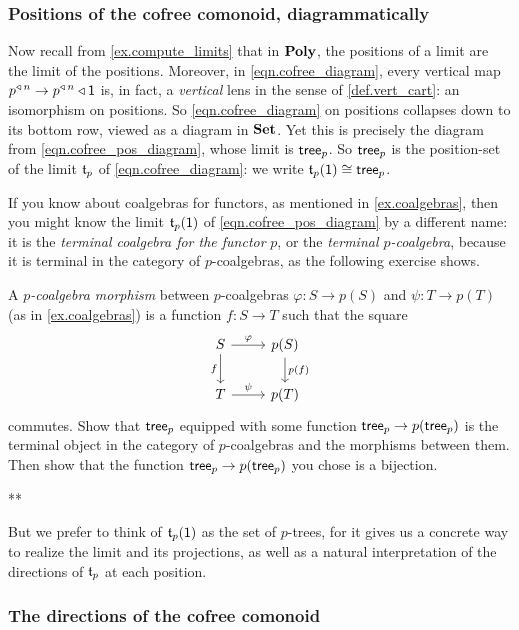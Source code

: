 \documentclass[Book-Poly]{subfiles}
\begin{document}
\subsubsection{Positions of the cofree comonoid, diagrammatically}

Now recall from \cref{ex.compute_limits} that in $\mathbf{Poly}$, the positions of a limit are the limit of the positions.
Moreover, in \eqref{eqn.cofree_diagram}, every vertical map $p^{\mathbin{\triangleleft}\,n}\to p^{\mathbin{\triangleleft}\,n}\mathbin{\triangleleft}\textsf{1}$ is, in fact, a \emph{vertical} lens in the sense of \cref{def.vert_cart}: an isomorphism on positions.
So \eqref{eqn.cofree_diagram} on positions collapses down to its bottom row, viewed as a diagram in $\mathbf{Set}$.
Yet this is precisely the diagram from \eqref{eqn.cofree_pos_diagram}, whose limit is $\mathsf{tree}_p$.
So $\mathsf{tree}_p$ is the position-set of the limit $\mathfrak{t}_p$ of \eqref{eqn.cofree_diagram}: we write $\mathfrak{t}_p(\textsf{1})\cong\mathsf{tree}_p$.

If you know about coalgebras for functors, as mentioned in \cref{ex.coalgebras}, then you might know the limit $\mathfrak{t}_p(\textsf{1})$ of \eqref{eqn.cofree_pos_diagram} by a different name: it is the \emph{terminal coalgebra for the functor} $p$, or the \emph{terminal $p$-coalgebra}, because it is terminal in the category of $p$-coalgebras, as the following exercise shows.

\begin{exercise}
A \emph{$p$-coalgebra morphism} between $p$-coalgebras $\varphi\colon S\to p(S)$ and $\psi\colon T\to p(T)$ (as in \cref{ex.coalgebras}) is a function $f\colon S\to T$ such that the square
\[
\begin{tikzcd}
    S \ar[r,"\varphi"] \ar[d,"f"'] & p(S) \ar[d,"p(f)"] \\
    T \ar[r,"\psi"] & p(T)
\end{tikzcd}
\]
commutes.
Show that $\mathsf{tree}_p$ equipped with some function $\mathsf{tree}_p\to p(\mathsf{tree}_p)$ is the terminal object in the category of $p$-coalgebras and the morphisms between them.
Then show that the function $\mathsf{tree}_p\to p(\mathsf{tree}_p)$ you chose is a bijection.
\begin{solution}
**
\end{solution}
\end{exercise}
But we prefer to think of $\mathfrak{t}_p(\textsf{1})$ as the set of $p$-trees, for it gives us a concrete way to realize the limit and its projections, as well as a natural interpretation of the directions of $\mathfrak{t}_p$ at each position.

\subsubsection{The directions of the cofree comonoid}
\end{document}
